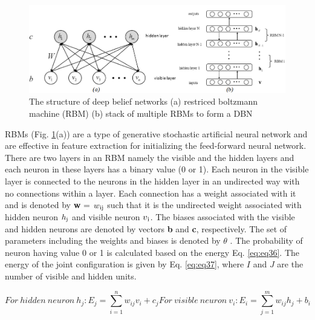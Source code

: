 \documentclass[preprint,review,12pt]{elsarticle}
\begin{document}
\begin{figure}[!h]
  \begin{center}
    \includegraphics[width=\linewidth]{323.png}
    \caption{The structure of deep belief networks (a) restriced boltzmann machine (RBM) (b) stack of multiple RBMs to form a DBN \cite{CITE9}}\label{fig:fig323}
  \end{center}
\end{figure}

RBMs (Fig. \ref{fig:fig323}(a)) are a type of generative stochastic artificial neural network and are effective in feature extraction for initializing the feed-forward neural network. There are two layers in an RBM namely the visible and the hidden layers and each neuron in these layers has a binary value (0 or 1). Each neuron in the visible layer is connected to the neurons in the hidden layer in an undirected way with no connections within a layer. Each connection has a weight associated with it and is denoted by \textbf{w} = ${w\textsubscript{ij}}$ such that it is the undirected weight associated with hidden neuron {$h\textsubscript{j}$} and visible neuron $v\textsubscript{i}$. The biases associated with the visible and hidden neurons are denoted by vectors \textbf{b} and \textbf{c}, respectively. The set of parameters including the weights and biases is denoted by $\theta$ \cite{CITE9}. The probability of neuron having value 0 or 1 is calculated based on the energy Eq. \ref{eq:eq36}. The energy of the joint configuration is given by Eq. \ref{eq:eq37}, where $I$ and $J$ are the number of visible and hidden units. \par

\begin{subequations}\label{eq:eq36}
  \begin{equation}
    For\: hidden\: neuron\: h_j: E_j = \sum_{i=1}^{n} w_{ij}v_i + c_j\label{eq:eq4}
  \end{equation}
  \begin{equation}
    For\: visible\: neuron\: v_i: E_i = \sum_{j=1}^{m} w_{ij}h_j + b_i\label{eq:eq5}
  \end{equation}
\end{subequations}
\end{document}
